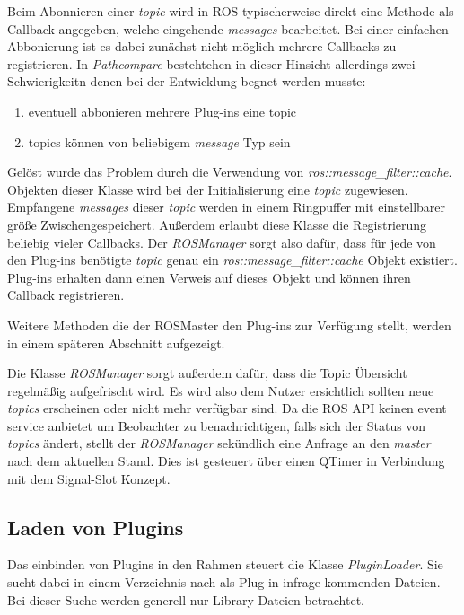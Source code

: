 Beim Abonnieren einer \textit{topic} wird in ROS typischerweise direkt eine
Methode als Callback angegeben, welche eingehende \textit{messages} bearbeitet.
Bei einer einfachen Abbonierung ist es dabei zunächst nicht möglich mehrere
Callbacks zu registrieren.
In \textit{Pathcompare} bestehtehen in dieser Hinsicht allerdings zwei
Schwierigkeitn denen bei der Entwicklung begnet werden musste:

\begin{enumerate}
  \item eventuell abbonieren mehrere Plug-ins eine topic
  \item topics können von beliebigem \textit{message} Typ sein
\end{enumerate}

Gelöst wurde das Problem durch die Verwendung von
\textit{ros::message\_filter::cache}. Objekten dieser Klasse wird bei der
Initialisierung eine \textit{topic} zugewiesen. Empfangene \textit{messages}
dieser \textit{topic} werden in einem Ringpuffer mit einstellbarer größe Zwischengespeichert.
Außerdem erlaubt diese Klasse die Registrierung beliebig vieler Callbacks.
Der \textit{ROSManager} sorgt also dafür, dass für jede von den Plug-ins
benötigte \textit{topic} genau ein \textit{ros::message\_filter::cache} Objekt
existiert. Plug-ins erhalten dann einen Verweis auf dieses Objekt und können
ihren Callback registrieren.

Weitere Methoden die der ROSMaster den Plug-ins zur Verfügung stellt, werden in einem
späteren Abschnitt aufgezeigt.

Die Klasse \textit{ROSManager} sorgt außerdem dafür, dass die Topic Übersicht
regelmäßig aufgefrischt wird. Es wird also dem Nutzer ersichtlich sollten neue
\textit{topics} erscheinen oder nicht mehr verfügbar sind.
Da die \gls{ROS} \gls{API} keinen event service anbietet um Beobachter zu benachrichtigen,
falls sich der Status von \textit{topics} ändert, stellt der \textit{ROSManager}
sekündlich eine Anfrage an den \textit{master} nach dem aktuellen Stand. 
Dies ist gesteuert über einen QTimer in Verbindung mit dem Signal-Slot Konzept.


\subsection{Laden von Plugins}

Das einbinden von Plugins in den Rahmen steuert die Klasse
\textit{PluginLoader}. Sie sucht dabei in einem Verzeichnis nach als Plug-in
infrage kommenden Dateien. Bei dieser Suche werden generell nur Library
Dateien betrachtet.


